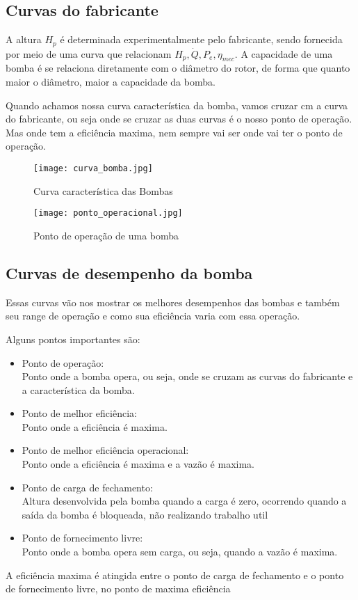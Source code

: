  \subsection{Curvas do fabricante}
 A altura \(H_p\) é determinada experimentalmente pelo fabricante, sendo fornecida por meio de uma
 curva que relacionam \(H_p, \dot{Q}, P_e, \eta_{mec}\). A capacidade de uma  bomba é se relaciona
 diretamente com o diâmetro do rotor, de forma que quanto maior o diâmetro, maior a capacidade da
 bomba. \par Quando achamos nossa curva característica da bomba, vamos cruzar cm a curva do
 fabricante, ou seja onde se cruzar as duas curvas é o nosso ponto de operação. Mas onde tem a
 eficiência maxima, nem sempre vai ser onde vai ter o ponto de operação.
 \begin{figure}[H]
    \centering
    \texttt{[image: curva\_bomba.jpg]}
    \caption{Curva característica das Bombas}
    \label{fig: curva_bomba}
 \end{figure}
 \begin{figure}[H]
    \centering
    \texttt{[image: ponto\_operacional.jpg]}
    \caption{Ponto de operação de uma bomba}
    \label{fig: ponto_operacional}
 \end{figure}
 \subsection{Curvas de desempenho da bomba}
 Essas curvas vão nos mostrar os melhores desempenhos das bombas e também seu range de operação e
 como sua eficiência varia com essa operação. \par
 
 Alguns pontos importantes são:
    \begin{itemize}
        \item {Ponto de operação: \\
        Ponto onde a bomba opera, ou seja, onde se cruzam as curvas do fabricante e a característica
        da bomba.}
        \item {Ponto de melhor eficiência: \\
        Ponto onde a eficiência é maxima.}
        \item {Ponto de melhor eficiência operacional: \\
        Ponto onde a eficiência é maxima e a vazão é maxima.}
        \item {Ponto de carga de fechamento: \\
        Altura desenvolvida pela bomba quando a carga é zero, ocorrendo quando a saída da bomba é
        bloqueada, não realizando trabalho util}
        \item {Ponto de fornecimento livre: \\
        Ponto onde a bomba opera sem carga, ou seja, quando a vazão é maxima.}
    \end{itemize}
A eficiência maxima é atingida entre o ponto de carga de fechamento e o ponto de fornecimento livre,
no ponto de maxima eficiência
